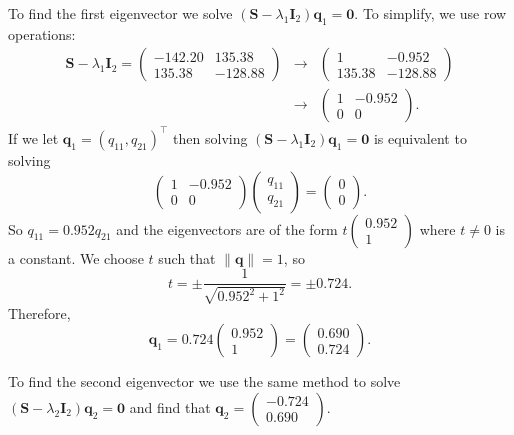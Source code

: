 \documentclass[]{book}
\theoremstyle{definition}
\theoremstyle{definition}
\theoremstyle{definition}
\theoremstyle{remark}
\begin{document}
To find the first eigenvector we solve \((\boldsymbol S- \lambda_1 \boldsymbol I_2) \boldsymbol q_1 = \boldsymbol 0\). To simplify, we use row operations:
\begin{eqnarray*}
\boldsymbol S- \lambda_1 \boldsymbol I_2 = \begin{pmatrix} -142.20 & 135.38 \\ 135.38 & -128.88 \end{pmatrix} &\rightarrow& \begin{pmatrix} 1 & -0.952 \\ 135.38 & -128.88 \end{pmatrix} \\
&\rightarrow& \begin{pmatrix} 1 & -0.952 \\ 0 & 0 \end{pmatrix}.
\end{eqnarray*}
If we let \(\boldsymbol q_1 = (q_{11}, q_{21})^\top\) then solving \((\boldsymbol S- \lambda_1 \boldsymbol I_2) \boldsymbol q_1 = \boldsymbol 0\) is equivalent to solving
\[ \begin{pmatrix} 1 & -0.952 \\ 0 & 0 \end{pmatrix} \begin{pmatrix} q_{11} \\ q_{21} \end{pmatrix} = \begin{pmatrix} 0 \\ 0 \end{pmatrix}. \]
So \(q_{11} = 0.952 q_{21}\) and the eigenvectors are of the form \(t\begin{pmatrix} 0.952 \\ 1 \end{pmatrix}\) where \(t \ne 0\) is a constant. We choose \(t\) such that \(\| \boldsymbol q\| = 1\), so
\[
{\displaystyle t = \pm \frac{1}{\sqrt{0.952^2 + 1^2}} = \pm 0.724}.
\]
Therefore,
\[ \boldsymbol q_1 = 0.724 \begin{pmatrix} 0.952 \\ 1 \end{pmatrix} = \begin{pmatrix} 0.690 \\ 0.724 \end{pmatrix}.\]

To find the second eigenvector we use the same method to solve \((\boldsymbol S- \lambda_2 \boldsymbol I_2) \boldsymbol q_2 = \boldsymbol 0\) and find that \(\boldsymbol q_2 = \begin{pmatrix} -0.724 \\ 0.690 \end{pmatrix}\).
\end{document}
